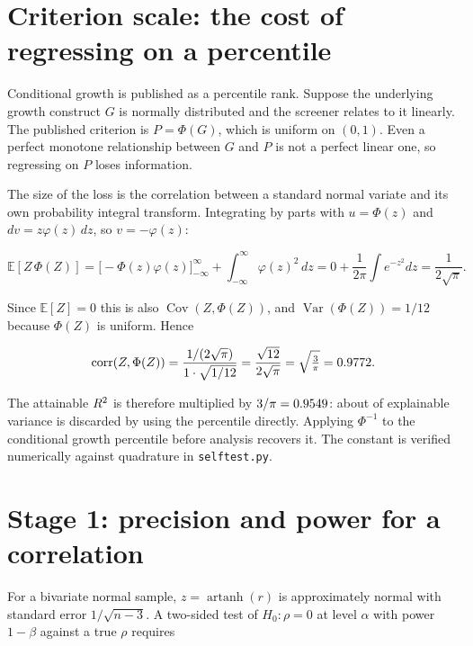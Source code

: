 \appendix

\section{Criterion scale: the cost of regressing on a percentile}
\label{app:uniform}

Conditional growth is published as a percentile rank. Suppose the underlying
growth construct $G$ is normally distributed and the screener relates to it
linearly. The published criterion is $P = \Phi(G)$, which is uniform on $(0,1)$.
Even a perfect monotone relationship between $G$ and $P$ is not a perfect linear
one, so regressing on $P$ loses information.

The size of the loss is the correlation between a standard normal variate and
its own probability integral transform. Integrating by parts with $u=\Phi(z)$
and $dv = z\varphi(z)\,dz$, so $v=-\varphi(z)$:

\[
\mathbb{E}[Z\,\Phi(Z)] = \Big[-\Phi(z)\varphi(z)\Big]_{-\infty}^{\infty}
  + \int_{-\infty}^{\infty}\varphi(z)^2\,dz
  = 0 + \frac{1}{2\pi}\int e^{-z^2}dz = \frac{1}{2\sqrt{\pi}}.
\]

Since $\mathbb{E}[Z]=0$ this is also $\operatorname{Cov}(Z,\Phi(Z))$, and
$\operatorname{Var}(\Phi(Z))=1/12$ because $\Phi(Z)$ is uniform. Hence

\[
\operatorname{corr}(Z,\Phi(Z))
 = \frac{1/(2\sqrt{\pi})}{1\cdot\sqrt{1/12}}
 = \frac{\sqrt{12}}{2\sqrt{\pi}} = \sqrt{\tfrac{3}{\pi}} = 0.9772.
\]

The attainable $R^{2}$ is therefore multiplied by $3/\pi = 0.9549$:
about \UniformAttenLossPct{} of explainable variance is discarded by using the
percentile directly. Applying $\Phi^{-1}$ to the conditional growth percentile
before analysis recovers it. The constant is verified numerically against
quadrature in \texttt{selftest.py}.

\section{Stage 1: precision and power for a correlation}
\label{app:stage1}

For a bivariate normal sample, $z=\operatorname{artanh}(r)$ is approximately
normal with standard error $1/\sqrt{n-3}$. A two-sided test of
$H_0\!:\rho=0$ at level $\alpha$ with power $1-\beta$ against a true $\rho$
requires

